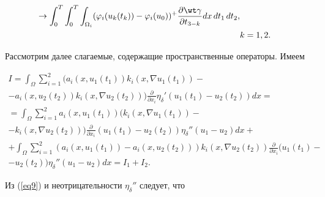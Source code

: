 \begin{pf}
\begin{align*}
\rightarrow 


\int_{0}^{T} \int_{0}^{T} \int_{\Omega_{i}}


(\varphi_{i}(u_{k}(t_{k}))-\varphi_{i}(u_{0}))^{+}


\frac{\partial \wt \gamma}{\partial t_{3-k}} dx\, dt_{1}\, dt_{2}, \\


&k=1,2.


\end{align*}





Рассмотрим далее слагаемые, содержащие пространственные операторы. Имеем


\begin{multline*}


I=\int_{\Omega} \sum^{2}_{i=1}


(a_{i}(x,u_{1}(t_{1})) k_{i}(x, \nabla u_{1}(t_{1}))- \\


%


-a_{i}(x,u_{2}(t_{2})) k_{i}(x, \nabla u_{2}(t_{2})))


\frac{\partial}{ \partial x_{i}}{\eta_{\delta}}'


(u_{1}(t_{1}) -u_{2}(t_{2})) dx= \\


%


=\int_{\Omega} \sum^{2}_{i=1}


a_{i}(x,u_{1}(t_{1})) (k_{i}(x, \nabla u_{1}(t_{1}))- \\


%


-k_{i}(x, \nabla u_{2}(t_{2}))) \frac{\partial}{\partial x_{i}}


(u_{1}(t_{1}) -u_{2}(t_{2})) {\eta_{\delta}}''(u_{1}-u_{2}) dx+ \\


%


+\int_{\Omega} \sum^{2}_{i=1}


(a_{i}(x,u_{1}(t_{1}))-a_{i}(x,u_{2}(t_{2})))k_{i}(x, \nabla u_{2}(t_{2}))


\frac{\partial}{\partial x_{i}}(u_{1}(t_{1}) - \\


%


-u_{2}(t_{2})) 


{\eta_{\delta}}''(u_{1}-u_{2}) dx=I_{1}+I_{2}.


\end{multline*}


Из (\ref{eq9}) и неотрицательности ${\eta_{\delta}}''$ следует, что



\end{pf}
